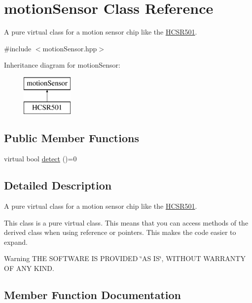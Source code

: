 \hypertarget{classmotion_sensor}{}\section{motion\+Sensor Class Reference}
\label{classmotion_sensor}


A pure virtual class for a motion sensor chip like the \mbox{\hyperlink{class_h_c_s_r501}{H\+C\+S\+R501}}.  




{\ttfamily \#include $<$motion\+Sensor.\+hpp$>$}

Inheritance diagram for motion\+Sensor\+:\begin{figure}[H]
\begin{center}
\leavevmode
\includegraphics[height=2.000000cm]{classmotion_sensor}
\end{center}
\end{figure}
\subsection*{Public Member Functions}
\begin{DoxyCompactItemize}
\item 
virtual bool \mbox{\hyperlink{classmotion_sensor_a0b8701a41516d8b1140c39474b1db9db}{detect}} ()=0
\end{DoxyCompactItemize}


\subsection{Detailed Description}
A pure virtual class for a motion sensor chip like the \mbox{\hyperlink{class_h_c_s_r501}{H\+C\+S\+R501}}. 

This class is a pure virtual class. This means that you can access methods of the derived class when using reference or pointers. This makes the code easier to expand. \begin{DoxyWarning}{Warning}
T\+HE S\+O\+F\+T\+W\+A\+RE IS P\+R\+O\+V\+I\+D\+ED \char`\"{}\+A\+S I\+S\char`\"{}, W\+I\+T\+H\+O\+UT W\+A\+R\+R\+A\+N\+TY OF A\+NY K\+I\+ND. 
\end{DoxyWarning}


\subsection{Member Function Documentation}
\mbox{\label{classmotion_sensor_a0b8701a41516d8b1140c39474b1db9db}} 

